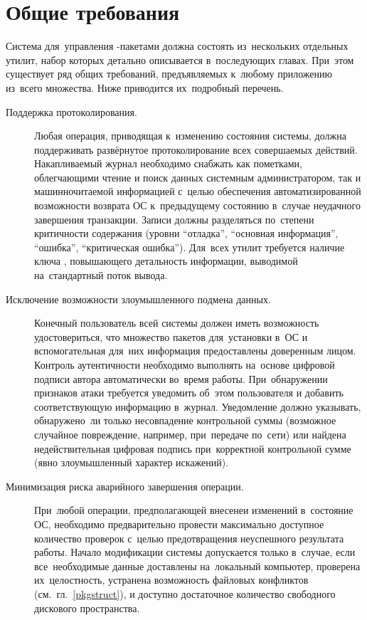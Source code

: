 
\section{Общие требования}

Система для~управления -пакетами должна состоять из~нескольких отдельных утилит,
набор которых детально описывается в~последующих главах.
При~этом существует ряд общих требований, предъявляемых к~любому приложению из~всего множества.
Ниже приводится их~подробный перечень.

\begin{description}

\item[Поддержка протоколирования.]
Любая операция, приводящая к~изменению состояния системы, 
должна поддерживать развёрнутое протоколирование всех совершаемых  действий.
Накапливаемый журнал необходимо снабжать как пометками, облегчающими чтение и поиск данных системным администратором,
так и машинночитаемой информацией с~целью обеспечения автоматизированной возможности 
возврата ОС к~предыдущему состоянию в~случае неудачного завершения транзакции. 
Записи должны разделяться по~степени критичности содержания 
(уровни ``отладка'', ``основная информация'', ``ошибка'', ``критическая ошибка'').
Для~всех утилит требуется наличие ключа ,
 повышающего детальность информации,
выводимой на~стандартный поток вывода.

\item[Исключение возможности злоумышленного подмена данных.]
Конечный пользователь всей системы должен иметь возможность удостовериться, что множество пакетов для~установки в~ОС и 
вспомогательная для~них информация предоставлены доверенным лицом.
Контроль аутентичности необходимо выполнять на~основе цифровой подписи   автора  автоматически  во~время работы.
При~обнаружении признаков атаки требуется уведомить об~этом пользователя и добавить соответствующую информацию в~журнал.
Уведомление должно указывать, обнаружено~ли только несовпадение контрольной суммы (возможное случайное повреждение, например, при~передаче по~сети)
или найдена недействительная цифровая подпись при~корректной контрольной сумме (явно злоумышленный характер искажений).

\item[Минимизация риска аварийного завершения операции.]
При~любой операции, предполагающей внесенеи изменений в~состояние ОС, необходимо предварительно 
провести максимально доступное количество проверок с~целью предотвращения неуспешного результата работы.
Начало модификации системы допускается только в~случае, если все~необходимые данные доставлены на~локальный компьютер,
проверена их~целостность, устранена возможность файловых конфликтов (см.~гл.~\ref{pkgstruct}), и доступно достаточное количество свободного дискового пространства.


\end{description}
